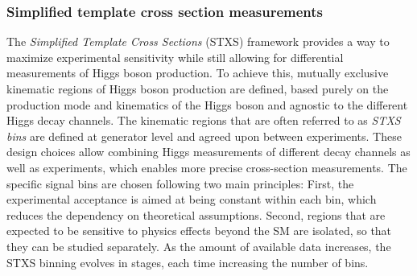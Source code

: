 \subsubsection{Simplified template cross section measurements}
The \emph{Simplified Template Cross Sections} (STXS) framework provides a way to maximize experimental sensitivity while still allowing for differential measurements of Higgs boson production.
To achieve this, mutually exclusive kinematic regions of Higgs boson production are defined, based purely on the production mode and kinematics of the Higgs boson and agnostic to the different Higgs decay channels. The kinematic regions that are often referred to as \emph{STXS bins} are defined at generator level and agreed upon between experiments.
These design choices allow combining Higgs measurements of different decay channels as well as experiments, which enables more precise cross-section measurements.
The specific signal bins are chosen following two main principles: First, the experimental acceptance is aimed at being constant within each bin, which reduces the dependency on theoretical assumptions. Second, regions that are expected to be sensitive to physics effects beyond the SM are isolated, so that they can be studied separately.
As the amount of available data increases, the STXS binning evolves in stages, each time increasing the number of bins. 





